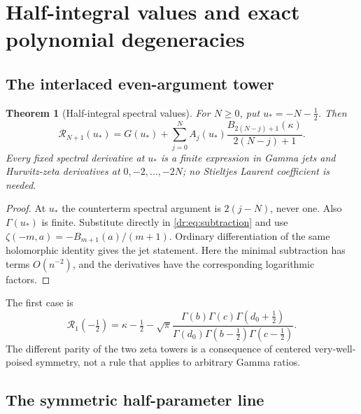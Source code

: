 \documentclass[11pt,letterpaper]{article}
\numberwithin{equation}{section}
\newtheorem{theorem}{Theorem}[section]
\theoremstyle{definition}
\theoremstyle{remark}
\newcommand{\Rcal}{\mathcal R}
\begin{document}
\section{Half-integral values and exact polynomial degeneracies}
\label{dr:sec:half}

\subsection{The interlaced even-argument tower}

\begin{theorem}[Half-integral spectral values]
\label{dr:thm:half}
For $N\geq0$, put $u_*=-N-\tfrac12$. Then
\begin{equation}
 \Rcal_{N+1}(u_*)=G(u_*)+
 \sum_{j=0}^N A_j(u_*)
       \frac{B_{2(N-j)+1}(\kappa)}{2(N-j)+1}.
 \label{dr:eq:half}
\end{equation}
Every fixed spectral derivative at $u_*$ is a finite expression in Gamma
jets and Hurwitz-zeta derivatives at $0,-2,\ldots,-2N$; no Stieltjes
Laurent coefficient is needed.
\end{theorem}

\begin{proof}
At $u_*$ the counterterm spectral argument is $2(j-N)$, never one.
Also $\Gamma(u_*)$ is finite. Substitute directly in
\eqref{dr:eq:subtraction} and use
$\zeta(-m,a)=-B_{m+1}(a)/(m+1)$. Ordinary differentiation of the same
holomorphic identity gives the jet statement. Here the minimal subtraction
has terms $O(n^{-2})$, and the derivatives have the corresponding
logarithmic factors.
\end{proof}

The first case is
\begin{equation}
 \Rcal_1(-\tfrac12)=\kappa-\tfrac12-
 \sqrt\pi\frac{\Gamma(b)\Gamma(c)\Gamma(d_0+\tfrac12)}
 {\Gamma(d_0)\Gamma(b-\tfrac12)\Gamma(c-\tfrac12)}.
 \label{dr:eq:first-half}
\end{equation}
The different parity of the two zeta towers is a consequence of centered
very-well-poised symmetry, not a rule that applies to arbitrary Gamma
ratios.

\subsection{The symmetric half-parameter line}
\end{document}
